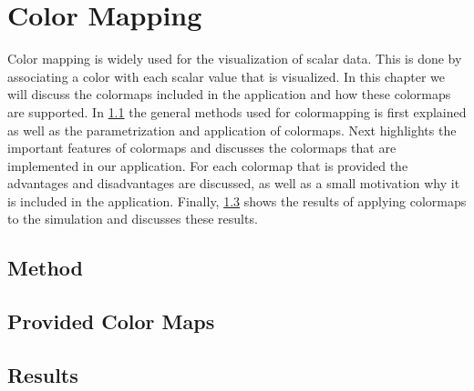 
\chapter{Color Mapping} %
\label{cha:color_mapping}
Color mapping is widely used for the visualization of scalar data. This is done by associating a color with each scalar value that is visualized. In this chapter we will discuss the colormaps included in the application and how these colormaps are supported. In \cref{s:colormapping:method} the general methods used for colormapping is first explained as well as the parametrization and application of colormaps. Next  highlights the important features of colormaps and discusses the colormaps that are implemented in our application. For each colormap that is provided the advantages and disadvantages are discussed, as well as a small motivation why it is included in the application. Finally, \cref{s:colormapping:results} shows the results of applying colormaps to the simulation and discusses these results.


\section{Method}
\label{s:colormapping:method}


\section{Provided Color Maps}
\label{s:colormaps:differentmaps}


\section{Results}
\label{s:colormapping:results}


